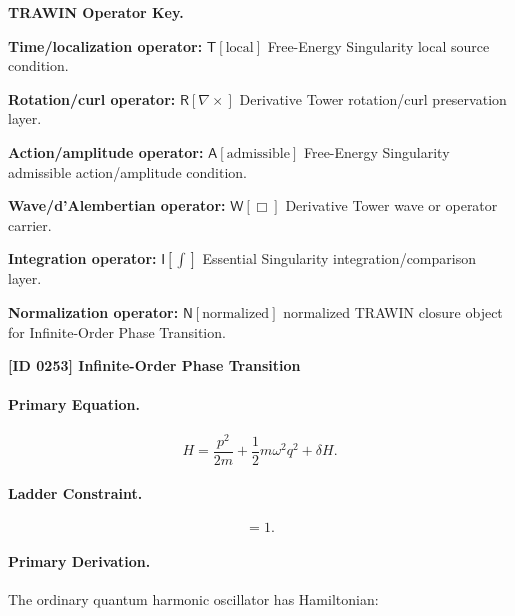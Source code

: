 \par\vspace{0.45\baselineskip}
\noindent\begin{minipage}[t]{\linewidth}
\begingroup
\small
\raggedright
\textbf{TRAWIN Operator Key.}\par
\noindent\textbf{Time/localization operator:} $\mathsf{T}\!\left[\mathrm{local}\right]$ Free-Energy Singularity local source condition.\par
\noindent\textbf{Rotation/curl operator:} $\mathsf{R}\!\left[\nabla\times\right]$ Derivative Tower rotation/curl preservation layer.\par
\noindent\textbf{Action/amplitude operator:} $\mathsf{A}\!\left[\mathrm{admissible}\right]$ Free-Energy Singularity admissible action/amplitude condition.\par
\noindent\textbf{Wave/d'Alembertian operator:} $\mathsf{W}\!\left[\Box\right]$ Derivative Tower wave or operator carrier.\par
\noindent\textbf{Integration operator:} $\mathsf{I}\!\left[\int\right]$ Essential Singularity integration/comparison layer.\par
\noindent\textbf{Normalization operator:} $\mathsf{N}\!\left[\mathrm{normalized}\right]$ normalized TRAWIN closure object for Infinite-Order Phase Transition.\par
\endgroup
\end{minipage}

\clearpage
\noindent\textbf{[ID 0253] Infinite-Order Phase Transition}\par
\vspace{0.35em}
\paragraph{Primary Equation.}
\begin{equation}
H
=
\frac{p^2}{2m}
+
\frac{1}{2}m\omega^2 q^2
+
\delta H .
\end{equation}

\paragraph{Ladder Constraint.}
\begin{equation}
[a,a^\dagger]=1 .
\end{equation}

\paragraph{Primary Derivation.}
The ordinary quantum harmonic oscillator has Hamiltonian:

